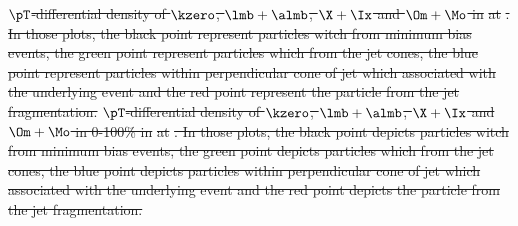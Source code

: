 \documentclass[ALICE,manyauthors]{cernphprep}
\providecommand{\DIFdel}[1]{{\protect\color{red}\sout{#1}}}                      %
\providecommand{\DIFdelbegin}{} %
\providecommand{\DIFdelFL}[1]{\DIFdel{#1}} %
\begin{document}
\DIFdelbegin %
{%
\DIFdelFL{$\pT$-differential density of $\kzero$, $\lmb + \almb$, $\X + \Ix$ and $\Om + \Mo$ in }%
\DIFdelFL{at }%
\DIFdelFL{. In those plots, the black point represent particles witch from minimum bias events, the green point represent particles which from the jet cones, the blue point represent particles within perpendicular cone of jet which associated with the underlying event and the red point represent the particle from the jet fragmentation.}}
{%
\DIFdelFL{$\pT$-differential density of $\kzero$, $\lmb + \almb$, $\X + \Ix$ and $\Om + \Mo$ in 0-100\% in }%
\DIFdelFL{at }%
\DIFdelFL{. In those plots, the black point depicts particles witch from minimum bias events, the green point depicts particles which from the jet cones, the blue point depicts particles within perpendicular cone of jet which associated with the underlying event and the red point depicts the particle from the jet fragmentation.}}
\end{document}
